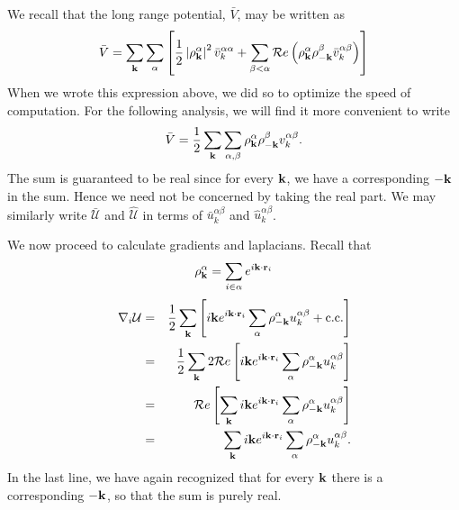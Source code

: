 \documentclass{article}
\begin{document}
We recall that the long range potential, $\bar{V}$, may be written as
\begin{equation}
\bar{V} = \sum_{\mathbf{k}} \sum_{\alpha} \left[ 
\frac{1}{2} \left| \rho^\alpha_{\mathbf{k}}\right|^2 \bar{v}^{\alpha
  \alpha}_k + 
\sum_{\beta < \alpha} \mathcal{R}e \left( \rho^{\alpha}_{\mathbf{k}}
  \rho^\beta_{-\mathbf{k}} \bar{v}^{\alpha\beta}_k \right)
\right] 
\end{equation}
When we wrote this expression above, we did so to optimize the speed
of computation.  For the following analysis, we will find it more
convenient to write
\begin{equation}
\bar{V} = \frac{1}{2} \sum_{\mathbf{k}} \sum_{\alpha, \beta} \rho_{\mathbf{k}}^\alpha
\rho_{-\mathbf{k}}^\beta v^{\alpha \beta}_k.
\end{equation}
The sum is guaranteed to be real since for every $\mathbf{k}$, we have a
corresponding $-\mathbf{k}$ in the sum.  Hence we need not be concerned by
taking the real part. We may similarly write $\bar{\mathcal{U}}$ and $\hat{\mathcal{U}}$ in
terms of $\bar{u}_k^{\alpha\beta}$ and $\hat{u}_k^{\alpha\beta}$.


We now proceed to calculate gradients and laplacians.
Recall that 
\begin{equation}
\rho_{\mathbf{k}}^\alpha = \sum_{i\in\alpha} e^{i\mathbf{k} \cdot \mathbf{r}_i}
\end{equation}
\begin{eqnarray}
\nabla_i \mathcal{U} & = & \frac{1}{2}\sum_{\mathbf{k}} \left[ i\mathbf{k} e^{i\mathbf{k} \cdot \mathbf{r}_i} \sum_\alpha
\rho_{-\mathbf{k}}^\alpha u^{\alpha \beta}_k + \text{c.c.} \right] \\
& = & \frac{1}{2} \sum_{\mathbf{k}} 2\mathcal{R}e \left[i\mathbf{k} e^{i\mathbf{k} \cdot \mathbf{r}_i} \sum_\alpha
\rho_{-\mathbf{k}}^\alpha u^{\alpha \beta}_k\right] \\ 
& = & \mathcal{R}e \left[ \sum_{\mathbf{k}} i\mathbf{k} e^{i\mathbf{k} \cdot \mathbf{r}_i} \sum_\alpha
\rho_{-\mathbf{k}}^\alpha u^{\alpha \beta}_k \right] \\
& = & \sum_{\mathbf{k}} i\mathbf{k} e^{i\mathbf{k} \cdot \mathbf{r}_i} \sum_\alpha
\rho_{-\mathbf{k}}^\alpha u^{\alpha \beta}_k.
\end{eqnarray}
In the last line, we have again recognized that for every $\mathbf{k}$
there is a corresponding $-\mathbf{k}$, so that the sum is purely real.
\end{document}
